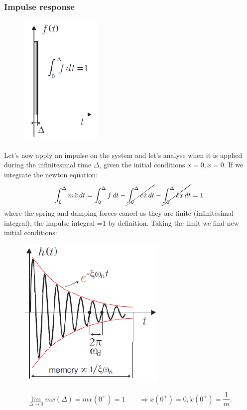 			\subsubsection{Impulse response}
				\begin{figure}
				\vspace{-5mm}
				\includegraphics[scale=0.6]{vibration/ch1/6}
				\end{figure}
				Let's now apply an impulse on the system and let's analyse when it is applied during the infinitesimal time $\Delta$, given the initial conditions $x = 0, \dot{x}=0$. If we integrate the newton equation:
				\begin{equation}
				\int _0 ^\Delta m \ddot{x} \,dt = \int _0 ^\Delta f \,dt - \cancel{\int _0 ^\Delta c \dot{x}\,dt} - \cancel{\int _0 ^\Delta kx\,dt} = 1
				\end{equation}				 
				where the spring and damping forces cancel as they are finite (infinitesimal integral), the impulse integral =1 by definition. Taking the limit we find new initial conditions:
				
				\begin{figure}
				\vspace{-5mm}
				\includegraphics[scale=0.5]{vibration/ch1/7}
				\end{figure}
				\begin{equation}
				\lim _{\Delta \rightarrow 0} m\dot{x}(\Delta) = m\dot{x}(0^+) = 1  \qquad \Rightarrow x(0^+) = 0, \dot{x}(0^+) = \frac{1}{m}.
				\end{equation}

